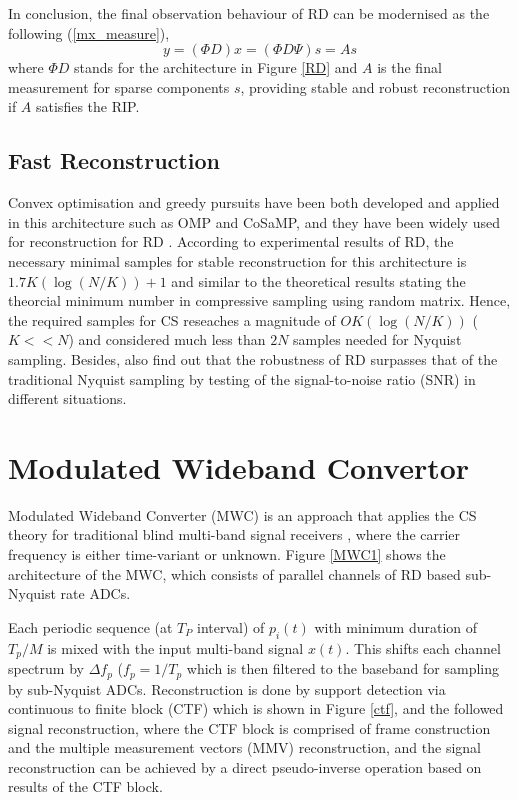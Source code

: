 In conclusion, the final observation behaviour of RD can be modernised as the following (\ref{mx_measure}),
\begin{equation} 
\label{mx_measure}
y = (\Phi D) x = (\Phi D \Psi) s = As
\end{equation}
where $\Phi D$ stands for the architecture in Figure \ref{RD} and $A$ is the final measurement for sparse components $s$, providing stable and robust reconstruction if $A$ satisfies the RIP.

\subsection{Fast Reconstruction}

Convex optimisation and greedy pursuits have been both developed and applied in this architecture such as OMP and CoSaMP, and they have been widely used for reconstruction for RD \cite{yang2009compressed,bai2012high}. According to experimental results of RD\cite{tropp2010beyond}, the necessary minimal samples for stable reconstruction for this architecture is $1.7K(\log(N/K))+1$ and similar to the theoretical results\cite{donoho2006high} stating the theorcial minimum number in compressive sampling using random matrix. Hence, the required samples for CS reseaches a magnitude of $OK(\log(N/K))$ ($K << N$) and considered much less than $2N$ samples needed for Nyquist sampling. Besides,\cite{tropp2010beyond} also find out that the robustness of RD surpasses that of the traditional Nyquist sampling by testing of the signal-to-noise ratio (SNR) in different situations.

\section{Modulated Wideband Convertor}

Modulated Wideband Converter (MWC) \cite{mishali2009blind} is an approach that applies the CS theory for traditional blind multi-band signal receivers \cite{black1980time}, where the carrier frequency is either time-variant or unknown. Figure \ref{MWC1} shows the architecture of the MWC, which consists of parallel channels of RD based sub-Nyquist rate ADCs.

Each periodic sequence (at $T_P$ interval) of $p_i(t)$ with minimum duration of $T_p/M$ is mixed with the input multi-band signal $x(t)$. This shifts each channel spectrum by $\Delta f_p$ ($f_p = 1/{T_p}$ which is then filtered to the baseband for sampling by sub-Nyquist ADCs. Reconstruction is done by support detection via continuous to finite block (CTF) which is shown in Figure \ref{ctf}, and the followed signal reconstruction, where the CTF block is comprised of frame construction and the multiple measurement vectors (MMV) reconstruction, and the signal reconstruction can be achieved by a direct pseudo-inverse operation based on results of the CTF block.

